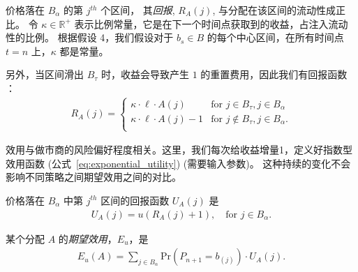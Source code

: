 \documentclass[sigconf, dvipsnames]{acmart}
\newcommand*{\util}{U_A}
\newcommand*{\reward}{R_A}
\begin{document}
\begin{definition}
价格落在 $B_{\alpha}$ 的第 $j^{th}$ 个区间， 其\textit{回报}, $\reward(j)$, 与分配在该区间的流动性成正比。
令 $\kappa \in \mathbb{R}^+$ 表示比例常量，它是在下一个时间点获取到的收益，占注入流动性的比例。
根据假设 4，我们假设对于 $b_s \in B$ 的每个中心区间，在所有时间点 $t=n$ 上，$\kappa$ 都是常量。

另外，当区间滑出 $B_{\tau}$ 时，收益会导致产生 $1$ 的重置费用，因此我们有回报函数 \cite{rewardfunction}：
\begin{align}
    \reward(j) =
    \begin{cases}
        \kappa \cdot \ell \cdot A(j) & \text{for } j \in B_{\tau}, j \in B_{\alpha} \\
        \kappa \cdot \ell \cdot A(j) - 1 & \text{for } j \notin B_{\tau}, j \in B_{\alpha}. \\
    \end{cases}
\end{align}
\end{definition}

效用与做市商的风险偏好程度相关。这里，我们每次给收益增量1，定义好指数型效用函数 (公式~\ref{eq:exponential_utility}) (需要输入参数)。
这种持续的变化不会影响不同策略之间期望效用之间的对比。
%
\begin{definition}
价格落在 $B_{\alpha}$ 中第 $j^{th}$ 区间的回报函数 $\util(j)$ 是
\begin{align}
    \util(j) = u\left(\reward(j)+1\right), \quad \text{for } j \in B_{\alpha}.
\end{align}
\end{definition}

\begin{definition}
    某个分配 $A$ 的\textit{期望效用}，$E_u$，是
\begin{align}\label{eq:expected_utility}
    E_u(A) = \sum_{j \in B_{\alpha}}\mathrm{Pr}\left(P_{n+1} = b_{(j)}\right) \cdot \util(j).
\end{align}
\end{definition}
\end{document}
